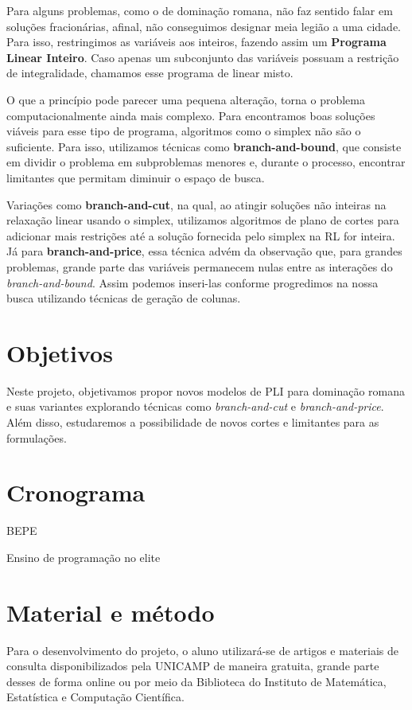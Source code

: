 \documentclass[11pt]{article}
\begin{document}
Para alguns problemas, como o de dominação romana, não faz sentido falar em soluções fracionárias, afinal, não conseguimos designar meia legião a uma cidade.
Para isso, restringimos as variáveis aos inteiros, fazendo assim um \textbf{Programa Linear Inteiro}. Caso apenas um subconjunto das variáveis possuam a restrição de integralidade, chamamos esse programa de linear misto.


O que a princípio pode parecer uma pequena alteração, torna o problema computacionalmente ainda mais complexo. Para encontramos boas soluções viáveis para esse tipo de programa, algoritmos como o simplex não são o suficiente. Para isso, utilizamos técnicas como \textbf{branch-and-bound}, que consiste em dividir o problema em subproblemas menores e, durante o processo, encontrar limitantes que permitam diminuir o espaço de busca.

Variações como \textbf{branch-and-cut}, na qual, ao atingir soluções não inteiras na relaxação linear usando o simplex, utilizamos algoritmos de plano de cortes para adicionar mais restrições até a solução fornecida pelo simplex na RL for inteira.
Já para \textbf{branch-and-price}, essa técnica advém da observação que, para grandes problemas, grande parte das variáveis permanecem nulas entre as interações do \emph{branch-and-bound}.
Assim podemos inseri-las conforme progredimos na nossa busca utilizando técnicas de geração de colunas.
\section{Objetivos}
\label{sec:orga31f331}
Neste projeto, objetivamos propor novos modelos de PLI para dominação romana e suas variantes explorando técnicas como \emph{branch-and-cut} e \emph{branch-and-price}.
Além disso, estudaremos a possibilidade de novos cortes e limitantes para as formulações.

\section{Cronograma}
\label{sec:orgebbfeda}
BEPE

Ensino de programação no elite
\section{Material e método}
\label{sec:orgff47998}
Para o desenvolvimento do projeto, o aluno utilizará-se de artigos e materiais de consulta disponibilizados pela UNICAMP de maneira gratuita, grande parte desses de forma online ou por meio da Biblioteca do Instituto de Matemática, Estatística e Computação Científica.
\end{document}
